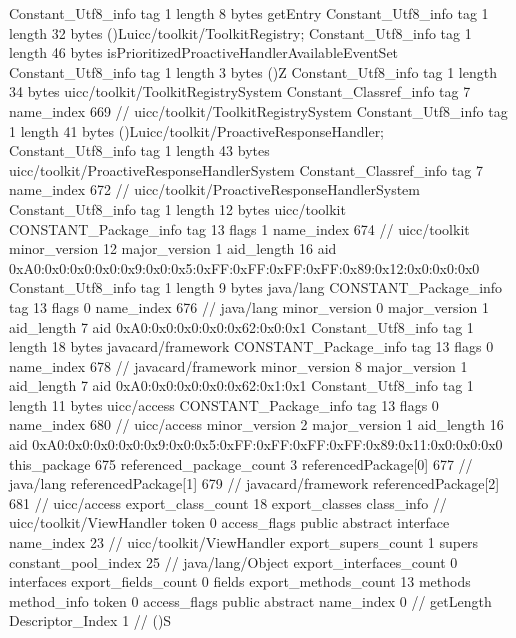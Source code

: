 {{		Constant_Utf8_info {
			tag	1
			length	8
			bytes	getEntry
		}
		Constant_Utf8_info {
			tag	1
			length	32
			bytes	()Luicc/toolkit/ToolkitRegistry;
		}
		Constant_Utf8_info {
			tag	1
			length	46
			bytes	isPrioritizedProactiveHandlerAvailableEventSet
		}
		Constant_Utf8_info {
			tag	1
			length	3
			bytes	()Z
		}
		Constant_Utf8_info {
			tag	1
			length	34
			bytes	uicc/toolkit/ToolkitRegistrySystem
		}
		Constant_Classref_info {
			tag	7
			name_index	669		// uicc/toolkit/ToolkitRegistrySystem
		}
		Constant_Utf8_info {
			tag	1
			length	41
			bytes	()Luicc/toolkit/ProactiveResponseHandler;
		}
		Constant_Utf8_info {
			tag	1
			length	43
			bytes	uicc/toolkit/ProactiveResponseHandlerSystem
		}
		Constant_Classref_info {
			tag	7
			name_index	672		// uicc/toolkit/ProactiveResponseHandlerSystem
		}
		Constant_Utf8_info {
			tag	1
			length	12
			bytes	uicc/toolkit
		}
		CONSTANT_Package_info {
			tag	13
			flags	1
			name_index	674		// uicc/toolkit
			minor_version	12
			major_version	1
			aid_length	16
			aid	0xA0:0x0:0x0:0x0:0x9:0x0:0x5:0xFF:0xFF:0xFF:0xFF:0x89:0x12:0x0:0x0:0x0
		}
		Constant_Utf8_info {
			tag	1
			length	9
			bytes	java/lang
		}
		CONSTANT_Package_info {
			tag	13
			flags	0
			name_index	676		// java/lang
			minor_version	0
			major_version	1
			aid_length	7
			aid	0xA0:0x0:0x0:0x0:0x62:0x0:0x1
		}
		Constant_Utf8_info {
			tag	1
			length	18
			bytes	javacard/framework
		}
		CONSTANT_Package_info {
			tag	13
			flags	0
			name_index	678		// javacard/framework
			minor_version	8
			major_version	1
			aid_length	7
			aid	0xA0:0x0:0x0:0x0:0x62:0x1:0x1
		}
		Constant_Utf8_info {
			tag	1
			length	11
			bytes	uicc/access
		}
		CONSTANT_Package_info {
			tag	13
			flags	0
			name_index	680		// uicc/access
			minor_version	2
			major_version	1
			aid_length	16
			aid	0xA0:0x0:0x0:0x0:0x9:0x0:0x5:0xFF:0xFF:0xFF:0xFF:0x89:0x11:0x0:0x0:0x0
		}
	}
	this_package	675
	referenced_package_count	3
	referencedPackage[0]	677		// java/lang
	referencedPackage[1]	679		// javacard/framework
	referencedPackage[2]	681		// uicc/access
	export_class_count	18
	export_classes {
		class_info {		// uicc/toolkit/ViewHandler
			token	0
			access_flags	public abstract interface
			name_index	23		// uicc/toolkit/ViewHandler
			export_supers_count	1
			supers {
				constant_pool_index	25		// java/lang/Object
			}
			export_interfaces_count	0
			interfaces {
			}
			export_fields_count	0
			fields {
			}
			export_methods_count	13
			methods {
				method_info {
					token	0
					access_flags	public abstract
					name_index	0		// getLength
					Descriptor_Index	1		// ()S
}}}}}
